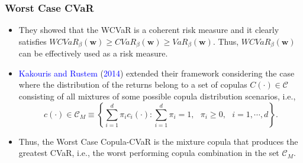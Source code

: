 \documentclass[pdf,10pt,xcolor=dvipsnames,hide notes]{beamer}
\begin{document}
\begin{frame}[label=frame2f]
	\frametitle{Worst Case CVaR}
	
	\begin{itemize}
		\justifying
		\setlength{\parskip}{15pt}
		
		\item They showed that the WCVaR is a coherent risk measure and
		it clearly satisfies $WCVaR_{\beta }\left( \mathbf{w}\right) \geq
		CVaR_{\beta }\left( \mathbf{w}\right) \geq VaR_{\beta }\left( \mathbf{w}%
		\right) $. Thus, $WCVaR_{\beta }\left( \mathbf{w}\right) $ can be
		effectively used as a risk measure.
		
		\item \textcolor{blue}{Kakouris and Rustem} (\textcolor{blue}{2014}) extended their framework considering the case where the distribution of the returns belong to a set of copulas $C\left( \cdot \right) \in \mathcal{C} 
		$ consisting of all mixtures of some possible copula distribution scenarios, i.e.,
\begin{equation}
c\left( \cdot \right) \in \mathcal{C}_{M}\equiv \left\{ \sum_{i=1}^{d}\pi
_{i}c_{i}\left( \cdot \right) :\sum_{i=1}^{d}\pi _{i}=1,\text{ }\pi _{i}\geq
0,\text{ }i=1,\cdots,d\right\}.  \label{28}
\end{equation}%

\item  Thus, the Worst Case Copula-CVaR is the mixture copula that produces the greatest CVaR, i.e., the worst performing copula combination in the set $\mathcal{C}_{M}$.


%		
		
	
\end{itemize}
	
	\end{frame}
\end{document}
